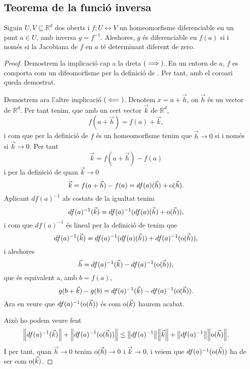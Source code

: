 \documentclass[../Apunts.tex]{subfiles}
\begin{document}
	\subsection{Teorema de la funció inversa}
	\begin{proposition}\label{prop:homeomorfisme a difeomorfisme}
		Siguin \(U,V\subseteq\mathbb{R}^{d}\) dos oberts i \(f\colon U\leftrightarrow V\) un homeomorfisme diferenciable en un punt \(a\in U\), amb inversa \(g=f^{-1}\). Aleshores, \(g\) és diferenciable en \(f(a)\) si i només si la Jacobiana de \(f\) en \(a\) té determinant diferent de zero.
		\begin{proof}
			Demostrem la implicació cap a la dreta \((\implies)\). En un entorn de \(a\), \(f\) es comporta com un difeomorfisme per la definició de . Per tant, amb el coro{\lgem}ari  queda demostrat.
			
			Demostrem ara l'altre implicació \((\impliedby)\). Denotem \(x=a+\vec{h}\), on \(\vec{h}\) és un vector de \(\mathbb{R}^{d}\). Per tant tenim, que amb un cert vector \(\vec{k}\) de \(\mathbb{R}^{d}\),
			\[f(a+\vec{h})=f(a)+\vec{k},\]
			i com que per la definició de  \(f\) és un homeomorfisme  tenim que \(\vec{h}\to0\) si i només si \(\vec{k}\to0\). Per tant
			\[\vec{k}=f(a+\vec{h})-f(a)\]
			i per la definició de  quan \(\vec{k}\to0\)
			\[\vec{k}=f(a+\vec{h})-f(a)=df(a)(\vec{h})+\operatorname{o}(\vec{h}).\]
			Aplicant \(df(a)^{-1}\) als costats de la igualtat tenim
			\[df(a)^{-1}(\vec{k})=df(a)^{-1}(df(a)(\vec{h})+\operatorname{o}(\vec{h})),\]
			i com que \(df(a)^{-1}\) és lineal per la definició de  tenim que
			\[df(a)^{-1}(\vec{k})=df(a)^{-1}(df(a)(\vec{h}))+df(a)^{-1}(\operatorname{o}(\vec{h})),\]
			i aleshores
			\[\vec{h}=df(a)^{-1}(\vec{k})-df(a)^{-1}(\operatorname{o}(\vec{h})),\]
			que és equivalent a, amb \(b=f(a)\),
			\[g(b+\vec{k})-g(b)=df(a)^{-1}(\vec{k})-df(a)^{-1}(\operatorname{o}(\vec{h})).\]
			Ara en veure que \(df(a)^{-1}(\operatorname{o}(\vec{h}))\) és com \(\operatorname{o}(\vec{k})\) haurem acabat.
			
			Això ho podem veure fent
			\[\norm{df(a)^{-1}(\vec{k})}+\norm{df(a)^{-1}(\omicron(\vec{h}))}\leq\norm{df(a)^{-1}}\norm{\vec{k}}+\norm{df(a)^{-1}}\norm{\omicron(\vec{h})}.\]
			I per tant, quan \(\vec{h}\to0\) tenim \(\operatorname{o}(\vec{h})\to0\) i \(\vec{k}\to0\), i veiem que \(df(a)^{-1}(\operatorname{o}(\vec{h}))\) ha de ser com \(\operatorname{o}(\vec{k})\). %
		\end{proof}
	\end{proposition}
\end{document}
